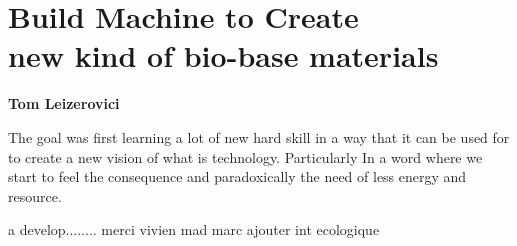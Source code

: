 \chapter*{\centering \Huge Build Machine to Create \\
new kind of bio-base materials }

\begin{center}
    \textbf{Tom Leizerovici} 
\end{center} 
The goal was first learning a lot of new hard skill in a way that it can be used for to create a new vision of what is technology. Particularly In a word where we start to feel the consequence \- and paradoxically the need \- 
of less energy and resource. 

a develop........
merci vivien mad marc
ajouter int ecologique 



\pagebreak

